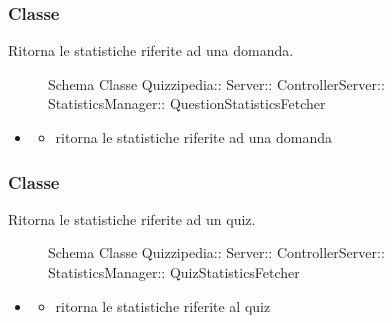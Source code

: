 \subsubsection{Classe }
Ritorna le statistiche riferite ad una domanda.
\begin{figure}[H]
\centering
\noindent{}
\caption[Schema Classe QuestionStatisticsFetcher]{Schema Classe Quizzipedia:: Server:: ControllerServer:: StatisticsManager:: QuestionStatisticsFetcher}
\end{figure}
\begin{itemize}
\item {}
\begin{itemize}
\item {}
\newline
ritorna le statistiche riferite ad una domanda
\newline
\end{itemize}
\end{itemize}
\subsubsection{Classe }
Ritorna le statistiche riferite ad un quiz.
\begin{figure}[H]
\centering
\noindent{}
\caption[Schema Classe QuizStatisticsFetcher]{Schema Classe Quizzipedia:: Server:: ControllerServer:: StatisticsManager:: QuizStatisticsFetcher}
\end{figure}
\begin{itemize}
\item {}
\begin{itemize}
\item {}
\newline
ritorna le statistiche riferite al quiz
\newline
\end{itemize}
\end{itemize}

